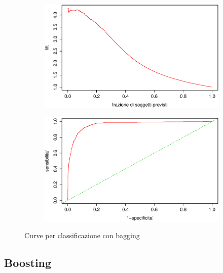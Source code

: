 \begin{figure}[H]
  \begin{subfigure}{0.4\textwidth}
    \includegraphics[width=\columnwidth]{images/class/lift-bagging.eps}
  \end{subfigure}
  \hspace*{\fill}
  \begin{subfigure}{0.4\textwidth}
    \includegraphics[width=\columnwidth]{images/class/roc-bagging.eps}
  \end{subfigure}
  \caption{Curve per classificazione con bagging}
  \label{fig:class-tree}
\end{figure}


\subsection{Boosting}\label{sec:class-boosting}

